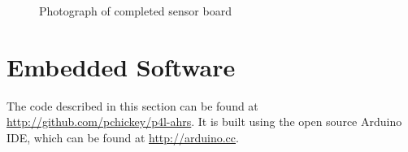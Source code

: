 \documentclass[12pt]{report}
\begin{document}
\begin{figure}
	\centering
	\caption{Photograph of completed sensor board}
	\label{fig:sensorphoto}
\end{figure}


\lstset{language=C++,basicstyle=\ttfamily}
\section{Embedded Software}
The code described in this section can be found at \url{http://github.com/pchickey/p4l-ahrs}. It is built using the open source Arduino IDE, which can be found at \url{http://arduino.cc}.
\end{document}
